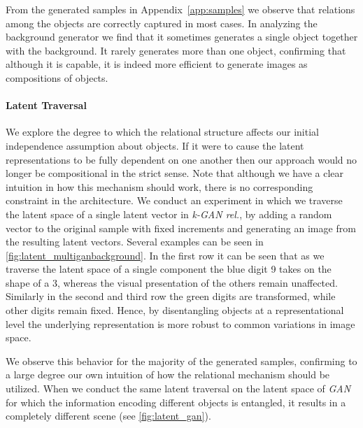 \documentclass{article}
\begin{document}
From the generated samples in Appendix~\ref{app:samples} we observe that relations among the objects are correctly captured in most cases.
In analyzing the background generator we find that it sometimes generates a single object together with the background.
It rarely generates more than one object, confirming that although it is capable, it is indeed more efficient to generate images as compositions of objects.

\paragraph{Latent Traversal}
We explore the degree to which the relational structure affects our initial independence assumption about objects.
If it were to cause the latent representations to be fully dependent on one another then our approach would no longer be compositional in the strict sense.
Note that although we have a clear intuition in how this mechanism should work, there is no corresponding constraint in the architecture. 
We conduct an experiment in which we traverse the latent space of a single latent vector in \emph{k-GAN rel.}, by adding a random vector to the original sample with fixed increments and generating an image from the resulting latent vectors. 
Several examples can be seen in \autoref{fig:latent_multiganbackground}.
In the first row it can be seen that as we traverse the latent space of a single component the blue digit 9 takes on the shape of a 3, whereas the visual presentation of the others remain unaffected.
Similarly in the second and third row the green digits are transformed, while other digits remain fixed.
Hence, by disentangling objects at a representational level the underlying representation is more robust to common variations in image space.

We observe this behavior for the majority of the generated samples, confirming to a large degree our own intuition of how the relational mechanism should be utilized. %
When we conduct the same latent traversal on the latent space of \emph{GAN} for which the information encoding different objects is entangled, it results in a completely different scene (see \autoref{fig:latent_gan}).
\end{document}
